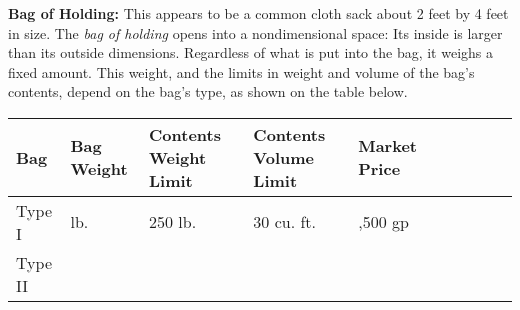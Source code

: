 \textbf{Bag of Holding:} This appears to be a common cloth sack about 2 feet by 
4 feet in size. The \textit{bag of holding }opens into a nondimensional space: 
Its inside is larger than its outside dimensions. Regardless of what is put into 
the bag, it weighs a fixed amount. This weight, and the limits in weight and volume 
of the bag's contents, depend on the bag's type, as shown on the table below.

\begin{longtable}{llllllllll}
\hline
\multicolumn{1}{|p{0.686in}|}{\begin{minipage}[t]{0.686in}\raggedright
\textbf{Bag}\end{minipage}} & \multicolumn{1}{p{0.583in}|}{\begin{minipage}[t]{0.583in}\centering
\textbf{Bag Weight}\end{minipage}} & \multicolumn{1}{p{0.750in}|}{\begin{minipage}[t]{0.750in}\raggedright
\textbf{Contents Weight Limit}\end{minipage}} & \multicolumn{1}{p{0.750in}|}{\begin{minipage}[t]{0.750in}\raggedright
\textbf{Contents Volume Limit}\end{minipage}} & \multicolumn{1}{p{0.875in}|}{\begin{minipage}[t]{0.875in}\raggedleft
\textbf{Market Price}\end{minipage}}\\
\hline
\multicolumn{1}{p{0.069in}|}{\begin{minipage}[t]{0.069in}\raggedleft
Type I\end{minipage}} & \multicolumn{1}{p{0.069in}|}{\begin{minipage}[t]{0.069in}\centering
15 lb.\end{minipage}} & \multicolumn{1}{p{0.069in}|}{\begin{minipage}[t]{0.069in}\raggedright
250 lb.\end{minipage}} & \multicolumn{1}{p{0.069in}|}{\begin{minipage}[t]{0.069in}\raggedright
30 cu. ft.\end{minipage}} & \multicolumn{1}{p{0.069in}|}{\begin{minipage}[t]{0.069in}\raggedleft
2,500 gp\end{minipage}}\\
\hline
\multicolumn{1}{|p{0.686in}|}{\begin{minipage}[t]{0.686in}\raggedleft
Type II\end{minipage}} & \multicolumn{1}{p{0.583in}|}{\begin{minipage}[t]{0.583in}\centering

\end{minipage}}
\end{longtable}
